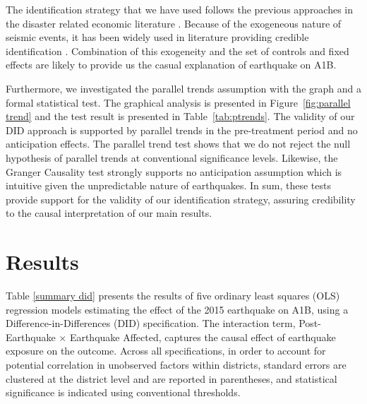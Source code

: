 \documentclass[11pt,a4paper]{article}
\begin{document}
The identification strategy that we have used follows the previous approaches in the disaster related economic literature \citep{paudel2023spillover,nandi2018effect,andrabi2017aid}. Because of the exogeneous nature of seismic events, it has been widely used in literature providing credible identification \citep{felbermayr2014naturally}. Combination of this exogeneity and the set of controls and fixed effects are likely to provide us the casual explanation of earthquake on A1B. 

\vspace{0.25 cm}

Furthermore, we investigated the parallel trends assumption with the graph and a formal statistical test. The graphical analysis is presented in Figure~\ref{fig:parallel trend} and the test result is presented in Table~\ref{tab:ptrends}. The validity of our DID approach is supported by parallel trends in the pre-treatment period and no anticipation effects. The parallel trend test shows that we do not reject the null hypothesis of parallel trends at conventional significance levels. Likewise, the Granger Causality test strongly supports no anticipation assumption which is intuitive given the unpredictable nature of earthquakes. In sum, these tests provide support for the validity of our identification strategy, assuring credibility to the causal interpretation of our main results.   

\vspace{0.25 cm}

\section{Results}

Table \ref{summary did} presents the results of five ordinary least squares (OLS) regression models estimating the effect of the 2015 earthquake on A1B, using a Difference-in-Differences (DID) specification. The interaction term, Post-Earthquake $\times$ Earthquake Affected, captures the causal effect of earthquake exposure on the outcome. Across all specifications, in order to account for potential correlation in unobserved factors within districts, standard errors are clustered at the district level and are reported in parentheses, and statistical significance is indicated using conventional thresholds.

\vspace{0.25cm}



\vspace{0.25cm}
\end{document}
